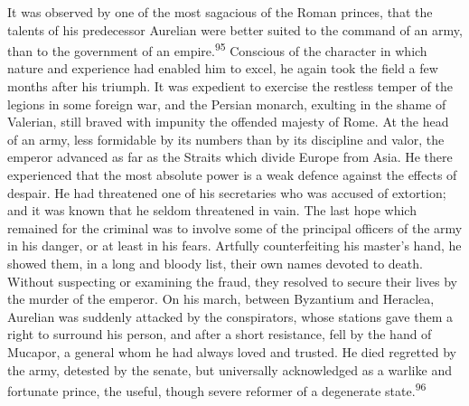It was observed by one of the most sagacious of the Roman
princes, that the talents of his predecessor Aurelian were better
suited to the command of an army, than to the government of an
empire.\textsuperscript{95} Conscious of the character in which nature and
experience had enabled him to excel, he again took the field a
few months after his triumph. It was expedient to exercise the
restless temper of the legions in some foreign war, and the
Persian monarch, exulting in the shame of Valerian, still braved
with impunity the offended majesty of Rome. At the head of an
army, less formidable by its numbers than by its discipline and
valor, the emperor advanced as far as the Straits which divide
Europe from Asia. He there experienced that the most absolute
power is a weak defence against the effects of despair. He had
threatened one of his secretaries who was accused of extortion;
and it was known that he seldom threatened in vain. The last hope
which remained for the criminal was to involve some of the
principal officers of the army in his danger, or at least in his
fears. Artfully counterfeiting his master’s hand, he showed them,
in a long and bloody list, their own names devoted to death.
Without suspecting or examining the fraud, they resolved to
secure their lives by the murder of the emperor. On his march,
between Byzantium and Heraclea, Aurelian was suddenly attacked by
the conspirators, whose stations gave them a right to surround
his person, and after a short resistance, fell by the hand of
Mucapor, a general whom he had always loved and trusted. He died
regretted by the army, detested by the senate, but universally
acknowledged as a warlike and fortunate prince, the useful,
though severe reformer of a degenerate state.\textsuperscript{96}



